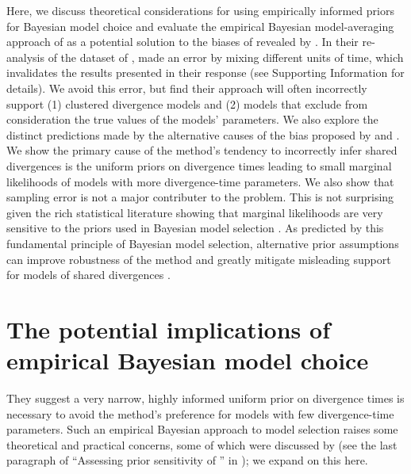 Here, we discuss theoretical considerations for using empirically informed
priors for Bayesian model choice and evaluate the empirical Bayesian
model-averaging approach of \citet{Hickerson2013} as a potential solution to
the biases of \msb revealed by \citet{Oaks2012}.
In their re-analysis of the dataset of \citet{Oaks2012}, \citet{Hickerson2013}
made an error by mixing different units of time, which invalidates the results
presented in their response (see Supporting Information for details).
We avoid this error, but find their approach will often incorrectly support
(1) clustered divergence models and
(2) models that exclude from consideration the true values of the models'
parameters.
We also explore the distinct predictions made by the alternative causes of the
bias proposed by \citet{Oaks2012} and \citet{Hickerson2013}.
We show the primary cause of the method's tendency to incorrectly infer shared
divergences is the uniform priors on divergence times leading to small marginal
likelihoods of models with more divergence-time parameters.
We also show that sampling error is not a major contributer to the problem.
This is not surprising given the rich statistical literature showing that
marginal likelihoods are very sensitive to the priors used in Bayesian model
selection
\citep[e.g.,][]{Jeffreys1939,Lindley1957}.
As predicted by this fundamental principle of Bayesian model selection,
alternative prior assumptions can improve robustness of the method and greatly
mitigate misleading support for models of shared divergences
\citet{Oaks2014dpp}.



\section{The potential implications of empirical Bayesian model choice}
%
They suggest a very narrow, highly informed uniform prior on divergence times
is necessary to avoid the method's preference for models with few
divergence-time parameters.
Such an empirical Bayesian approach to model selection raises some theoretical
and practical concerns, some of which were discussed by \citet{Oaks2012} (see
the last paragraph of ``Assessing prior sensitivity of \msb'' in
\citet{Oaks2012}); we expand on this here.

